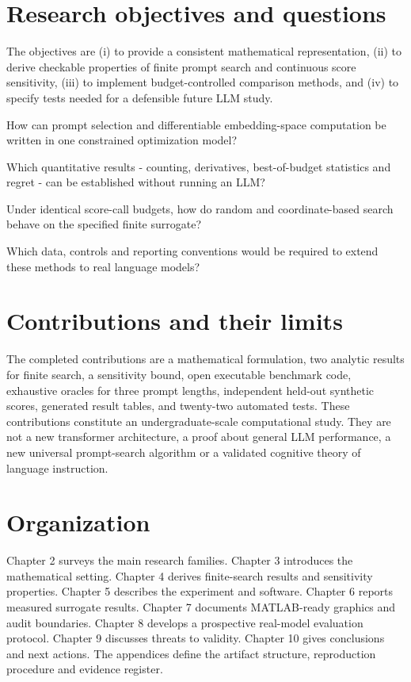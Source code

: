 \documentclass[12pt,a4paper,oneside]{report}
\begin{document}
\section{Research objectives and questions}
The objectives are (i) to provide a consistent mathematical representation, (ii) to derive checkable properties of finite prompt search and continuous score sensitivity, (iii) to implement budget-controlled comparison methods, and (iv) to specify tests needed for a defensible future LLM study.

\begin{description}[leftmargin=20mm,style=nextline]
\item[RQ1.] How can prompt selection and differentiable embedding-space computation be written in one constrained optimization model?
\item[RQ2.] Which quantitative results - counting, derivatives, best-of-budget statistics and regret - can be established without running an LLM?
\item[RQ3.] Under identical score-call budgets, how do random and coordinate-based search behave on the specified finite surrogate?
\item[RQ4.] Which data, controls and reporting conventions would be required to extend these methods to real language models?
\end{description}

\section{Contributions and their limits}
The completed contributions are a mathematical formulation, two analytic results for finite search, a sensitivity bound, open executable benchmark code, exhaustive oracles for three prompt lengths, independent held-out synthetic scores, generated result tables, and twenty-two automated tests. These contributions constitute an undergraduate-scale computational study. They are not a new transformer architecture, a proof about general LLM performance, a new universal prompt-search algorithm or a validated cognitive theory of language instruction.

\section{Organization}
Chapter 2 surveys the main research families. Chapter 3 introduces the mathematical setting. Chapter 4 derives finite-search results and sensitivity properties. Chapter 5 describes the experiment and software. Chapter 6 reports measured surrogate results. Chapter 7 documents MATLAB-ready graphics and audit boundaries. Chapter 8 develops a prospective real-model evaluation protocol. Chapter 9 discusses threats to validity. Chapter 10 gives conclusions and next actions. The appendices define the artifact structure, reproduction procedure and evidence register.
\end{document}
